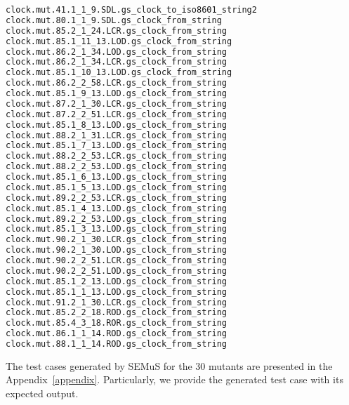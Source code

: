 \begin{lstlisting}[language=bash, label=inspection, caption=Mutants to be manually inspected.]
clock.mut.41.1_1_9.SDL.gs_clock_to_iso8601_string2
clock.mut.80.1_1_9.SDL.gs_clock_from_string
clock.mut.85.2_1_24.LCR.gs_clock_from_string
clock.mut.85.1_11_13.LOD.gs_clock_from_string
clock.mut.86.2_1_34.LOD.gs_clock_from_string
clock.mut.86.2_1_34.LCR.gs_clock_from_string
clock.mut.85.1_10_13.LOD.gs_clock_from_string
clock.mut.86.2_2_58.LCR.gs_clock_from_string
clock.mut.85.1_9_13.LOD.gs_clock_from_string
clock.mut.87.2_1_30.LCR.gs_clock_from_string
clock.mut.87.2_2_51.LCR.gs_clock_from_string
clock.mut.85.1_8_13.LOD.gs_clock_from_string
clock.mut.88.2_1_31.LCR.gs_clock_from_string
clock.mut.85.1_7_13.LOD.gs_clock_from_string
clock.mut.88.2_2_53.LCR.gs_clock_from_string
clock.mut.88.2_2_53.LOD.gs_clock_from_string
clock.mut.85.1_6_13.LOD.gs_clock_from_string
clock.mut.85.1_5_13.LOD.gs_clock_from_string
clock.mut.89.2_2_53.LCR.gs_clock_from_string
clock.mut.85.1_4_13.LOD.gs_clock_from_string
clock.mut.89.2_2_53.LOD.gs_clock_from_string
clock.mut.85.1_3_13.LOD.gs_clock_from_string
clock.mut.90.2_1_30.LCR.gs_clock_from_string
clock.mut.90.2_1_30.LOD.gs_clock_from_string
clock.mut.90.2_2_51.LCR.gs_clock_from_string
clock.mut.90.2_2_51.LOD.gs_clock_from_string
clock.mut.85.1_2_13.LOD.gs_clock_from_string
clock.mut.85.1_1_13.LOD.gs_clock_from_string
clock.mut.91.2_1_30.LCR.gs_clock_from_string
clock.mut.85.2_2_18.ROD.gs_clock_from_string
clock.mut.85.4_3_18.ROR.gs_clock_from_string
clock.mut.86.1_1_14.ROD.gs_clock_from_string
clock.mut.88.1_1_14.ROD.gs_clock_from_string
\end{lstlisting}



The test cases generated by SEMuS for the 30 mutants are presented in the Appendix~\ref{appendix}. Particularly, we provide the generated test case with its expected output.
